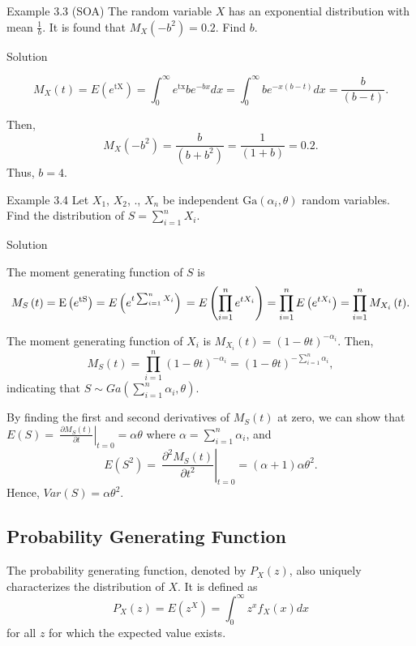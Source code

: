 \documentclass[]{book}
\begin{document}
Example 3.3 (SOA) The random variable \(X\) has an exponential
distribution with mean \(\frac{1}{b}\). It is found that
\(M_{X}\left( - b^{2} \right) = 0.2\). Find \(b\).

Solution

\[M_{X}\left( t \right) = E\left( e^{\text{tX}} \right) = \int_{0}^{\infty}{e^{\text{tx}}be^{- bx} dx} = \int_{0}^{\infty}{be^{- x\left( b - t \right)} dx} = \frac{b}{\left( b - t \right)}.\]

Then,
\[M_{X}\left( - b^{2} \right) = \frac{b}{\left( b + b^{2} \right)} = \frac{1}{\left( 1 + b \right)} = 0.2.\]
Thus, \(b = 4\).

Example 3.4 Let \(X_{1}\), \(X_{2}\), ., \(X_{n}\) be independent
\(\text{Ga}\left( \alpha_{i},\theta \right)\) random variables. Find the
distribution of \(S = \sum_{i = 1}^{n}X_{i}\).

Solution

The moment generating function of \(S\) is
\[M_{S}\left( t \right) = \text{E}\left( e^{\text{tS}} \right) = E\left( e^{t\sum_{i = 1}^{n}X_{i}} \right) \\
= E\left( \prod_{i = 1}^{n}e^{tX_{i}} \right) = \prod_{i = 1}^{n}{E\left( e^{tX_{i}} \right) = \prod_{i = 1}^{n}{M_{X_{i}}\left( t \right)}} .\]

The moment generating function of \(X_{i}\) is
\(M_{X_{i}}\left( t \right) = \left( 1 - \theta t \right)^{- \alpha_{i}}\).
Then,
\[M_{S}\left( t \right) = \prod_{i = 1}^{n}\left( 1 - \theta t \right)^{- \alpha_{i}} = \left( 1 - \theta t \right)^{- \sum_{i = 1}^{n}\alpha_{i}}, \]
indicating that
\(S\sim Ga\left( \sum_{i = 1}^{n}\alpha_{i},\theta \right)\).

By finding the first and second derivatives of \(M_{S}\left( t \right)\)
at zero, we can show that
\(E\left( S \right) = \left. \ \frac{\partial M_{S}\left( t \right)}{\partial t} \right|_{t = 0} = \alpha\theta\)
where \(\alpha = \sum_{i = 1}^{n}\alpha_{i}\), and
\[E\left( S^{2} \right) = \left. \ \frac{\partial^{2}M_{S}\left( t \right)}{\partial t^{2}} \right|_{t = 0} = \left( \alpha + 1 \right)\alpha\theta^{2}.\]
Hence, \(Var\left( S \right) = \alpha\theta^{2}\).

\subsection{Probability Generating
Function}\label{probability-generating-function-1}

The probability generating function, denoted by
\(P_{X}\left( z \right)\), also uniquely characterizes the distribution
of \(X\). It is defined as
\[P_{X}\left( z \right) = E\left( z^{X} \right) = \int_{0}^{\infty}{z^{x}f_{X}\left( x \right) dx}\]
for all \(z\) for which the expected value exists.
\end{document}
